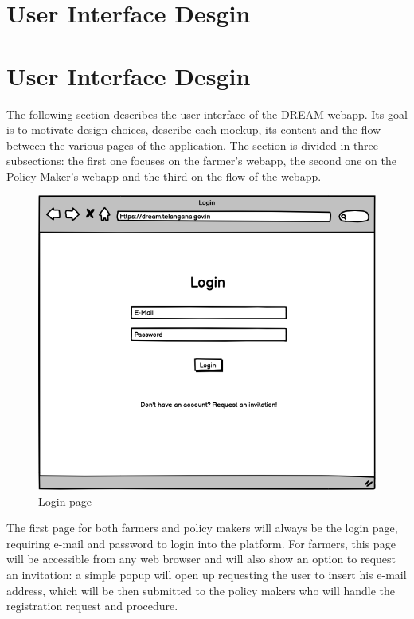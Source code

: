 \documentclass[10pt]{article} %
\begin{document}
\section{User Interface Desgin}

\section{User Interface Desgin} %
The following section describes the user interface of the DREAM webapp. Its goal is to motivate design choices, 
describe each mockup, its content and the flow between the various pages of the application.
The section is divided in three subsections: the first one focuses on the farmer's webapp, the second one on the Policy Maker's webapp
and the third on the flow of the webapp.\\
\begin{figure}[h]
    \centering
    \includegraphics[scale=0.4]{images/uimockups/login.png}
    \caption{Login page}
    \label{fig:ui_login}
\end{figure}
The first page for both farmers and policy makers will always be the login page, requiring e-mail and password to login into the platform.
For farmers, this page will be accessible from any web browser and will also show an option to request an invitation: a simple popup will open up requesting
the user to insert his e-mail address, which will be then submitted to the policy makers who will handle the registration request and procedure.
\end{document}
